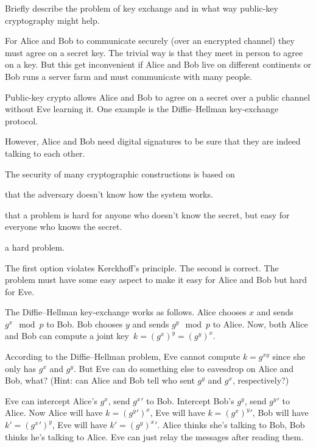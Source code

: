 \question[3]
Briefly describe the problem of key exchange and in what way public-key 
cryptography might help.

\begin{solution}
  For Alice and Bob to communicate securely (over an encrypted channel) they 
  must agree on a secret key.
  The trivial way is that they meet in person to agree on a key.
  But this get inconvenient if Alice and Bob live on different continents or 
  Bob runs a server farm and must communicate with many people.

  Public-key crypto allows Alice and Bob to agree on a secret over a public 
  channel without Eve learning it.
  One example is the Diffie--Hellman key-exchange protocol.

  However, Alice and Bob need digital signatures to be sure that they are 
  indeed talking to each other.
\end{solution}


\question
The security of many cryptographic constructions is based on
\begin{choices}
  \choice that the adversary doesn't know how the system works.

  \CorrectChoice that a problem is hard for anyone who doesn't know the secret, 
  but easy for everyone who knows the secret.

  \choice a hard problem.
\end{choices}

\begin{solution}
  The first option violates Kerckhoff's principle.
  The second is correct.
  The problem must have some easy aspect to make it easy for Alice and Bob but 
  hard for Eve.
\end{solution}


\question[3]
The Diffie--Hellman key-exchange works as follows.
Alice chooses \(x\) and sends \(g^x \mod p\) to Bob.
Bob chooses \(y\) and sends \(g^y \mod p\) to Alice.
Now, both Alice and Bob can compute a joint key~\(k = (g^x)^y = (g^y)^x\).

According to the Diffie--Hellman problem, Eve cannot compute \(k = g^{xy}\) 
since she only has \(g^x\) and \(g^y\).
But Eve can do something else to eavesdrop on Alice and Bob, what?
(Hint: can Alice and Bob tell who sent \(g^y\) and \(g^x\), respectively?)

\begin{solution}
  Eve can intercept Alice's \(g^x\), send \(g^x'\) to Bob.
  Intercept Bob's \(g^y\), send \(g^y'\) to Alice.
  Now Alice will have \(k = (g^y')^x\), Eve will have \(k = (g^x)^y'\),
  Bob will have \(k' = (g^x')^y\), Eve will have \(k' = (g^y)^x'\).
  Alice thinks she's talking to Bob, Bob thinks he's talking to Alice.
  Eve can just relay the messages after reading them.
\end{solution}


